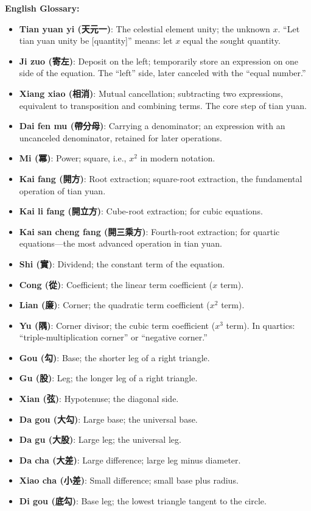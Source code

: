 \documentclass[9pt,a4paper]{article}
\begin{document}
\begin{minipage}[t]{0.50\textwidth}
\noindent\textbf{English Glossary:}

\begin{itemize}[leftmargin=1em,itemsep=2pt,topsep=2pt]
  \item \textbf{Tian yuan yi (天元一)}: The celestial element unity; the unknown $x$.
  ``Let tian yuan unity be [quantity]'' means: let $x$ equal the sought quantity.
  \item \textbf{Ji zuo (寄左)}: Deposit on the left; temporarily store an expression
  on one side of the equation. The ``left'' side, later canceled with the ``equal number.''
  \item \textbf{Xiang xiao (相消)}: Mutual cancellation; subtracting two expressions,
  equivalent to transposition and combining terms. The core step of tian yuan.
  \item \textbf{Dai fen mu (帶分母)}: Carrying a denominator; an expression with
  an uncanceled denominator, retained for later operations.
  \item \textbf{Mi (冪)}: Power; square, i.e., $x^2$ in modern notation.
  \item \textbf{Kai fang (開方)}: Root extraction; square-root extraction, the
  fundamental operation of tian yuan.
  \item \textbf{Kai li fang (開立方)}: Cube-root extraction; for cubic equations.
  \item \textbf{Kai san cheng fang (開三乘方)}: Fourth-root extraction; for
  quartic equations---the most advanced operation in tian yuan.
  \item \textbf{Shi (實)}: Dividend; the constant term of the equation.
  \item \textbf{Cong (從)}: Coefficient; the linear term coefficient ($x$ term).
  \item \textbf{Lian (廉)}: Corner; the quadratic term coefficient ($x^2$ term).
  \item \textbf{Yu (隅)}: Corner divisor; the cubic term coefficient ($x^3$ term).
  In quartics: ``triple-multiplication corner'' or ``negative corner.''
  \item \textbf{Gou (勾)}: Base; the shorter leg of a right triangle.
  \item \textbf{Gu (股)}: Leg; the longer leg of a right triangle.
  \item \textbf{Xian (弦)}: Hypotenuse; the diagonal side.
  \item \textbf{Da gou (大勾)}: Large base; the universal base.
  \item \textbf{Da gu (大股)}: Large leg; the universal leg.
  \item \textbf{Da cha (大差)}: Large difference; large leg minus diameter.
  \item \textbf{Xiao cha (小差)}: Small difference; small base plus radius.
  \item \textbf{Di gou (底勾)}: Base leg; the lowest triangle tangent to the circle.
\end{itemize}
\end{minipage}
\vspace{0.15cm}
\end{document}
